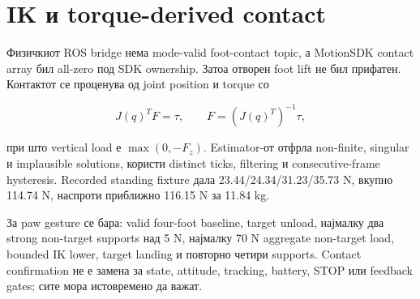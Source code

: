 \section{IK и torque-derived contact}

Физичкиот ROS bridge нема mode-valid foot-contact topic, а MotionSDK contact
array бил all-zero под SDK ownership. Затоа отворен foot lift не бил прифатен.
Контактот се проценува од joint position и torque со

\begin{equation}
  J(q)^{T}F=\tau, \qquad F=(J(q)^{T})^{-1}\tau,
  \label{eq:contact-estimator}
\end{equation}

при што vertical load е $\max(0,-F_z)$. Estimator-от отфрла non-finite,
singular и implausible solutions, користи distinct ticks, filtering и
consecutive-frame hysteresis. Recorded standing fixture дала
23.44/24.34/31.23/35.73 N, вкупно 114.74 N, наспроти приближно 116.15 N за
11.84 kg.

За paw gesture се бара: valid four-foot baseline, target unload, најмалку два
strong non-target supports над 5 N, најмалку 70 N aggregate non-target load,
bounded IK lower, target landing и повторно четири supports. Contact
confirmation не е замена за state, attitude, tracking, battery, STOP или
feedback gates; сите мора истовремено да важат.
